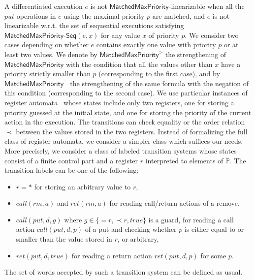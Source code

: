 A differentiated execution $e$ is not $\mathsf{MatchedMaxPriority}$-linearizable when all the $\textit{put}$ operations in $e$ using the maximal priority $p$ are matched, and $e$ is not linearizable w.r.t. the set of sequential executions satisfying $\mathsf{MatchedMaxPriority\text{-}Seq}(e,x)$ for {\color {blue}any value $x$ of priority $p$}. We consider two cases depending on whether $e$ contains exactly one value with priority $p$ or at least two values. We denote by $\mathsf{MatchedMaxPriority}^{>}$ the strengthening of $\mathsf{MatchedMaxPriority}$ with the condition that all the values other than $x$ have a priority strictly smaller than $p$ (corresponding to the first case), and by $\mathsf{MatchedMaxPriority}^{=}$ the strengthening of the same formula with the negation of this condition (corresponding to the second case).
We use particular instances of register automata~\cite{finite-memory, the paper I found} whose states include only two registers, one for storing a priority guessed at the initial state, and one for storing the priority of the current action in the execution. The transitions can check equality or the order relation $\prec$ between the values stored in the two registers. Instead of formalizing the full class of register automata, we consider a simpler class which suffices our needs. More precisely, we consider a class of labeled transition systems whose states consist of a finite control part and a register $r$ interpreted to elements of $\mathbb{P}$. The transition labels can be one of the following:
\begin{itemize}
	\item $r=*$ for storing an arbitrary value to $r$,
	\item $\textit{call}(\textit{rm},a)$ and $\textit{ret}(\textit{rm},a)$ for reading call/return actions of a remove,
	\item $\textit{call}(\textit{put},d,g)$ where $g\in\{=r,\prec r,true\}$ is a guard, for reading a call action $\textit{call}(\textit{put},d,p)$ of a put and checking whether $p$ is either equal to or smaller than the value stored in $r$, or arbitrary,
	\item $\textit{ret}(\textit{put},d,true)$ for reading a return action $\textit{ret}(\textit{put},d,p)$ for some $p$.
\end{itemize}
The set of words accepted by such a transition system can be defined as usual.

